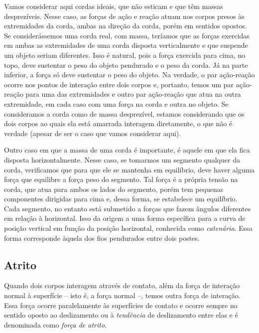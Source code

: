Vamos considerar aqui cordas ideais, que não esticam e que têm massas desprezíveis. Nesse caso, as forças de ação e reação atuam nos corpos presos às extremidades da corda, ambas na direção da corda, porém em sentidos opostos. Se considerássemos uma corda real, com massa, teríamos que as forças exercidas em ambas as extremidades de uma corda disposta verticalmente e que suspende um objeto seriam diferentes. Isso é natural, pois a força exercida para cima, no topo, deve sustentar o peso do objeto pendurado e o peso da corda. Já na parte inferior, a força só deve sustentar o peso do objeto. Na verdade, o par ação-reação ocorre nos pontos de interação entre dois corpos e, portanto, temos um par ação-reação para uma das extremidades e outro par ação-reação que atua na outra extremidade, em cada caso com uma força na corda e outra no objeto. Se consideramos a corda como de massa desprezível, estamos considerando que os dois corpos ao quais ela está amarrada interagem diretamente, o que não é verdade (apesar de ser o caso que vamos considerar aqui). 

Outro caso em que a massa de uma corda é importante, é aquele em que ela fica disposta horizontalmente. Nesse caso, se tomarmos um segmento qualquer da corda, verificamos que para que ele se mantenha em equilíbrio, deve haver alguma força que equilibre a força peso do segmento. Tal força é a própria tensão na corda, que atua para ambos os lados do segmento, porém tem pequenas componentes dirigidas para cima e, dessa forma, se estabelece um equilíbrio. Cada segmento, no entanto está submetido a forças que fazem ângulos diferentes em relação à horizontal. Isso da origem a uma forma específica para a curva de posição vertical em função da posição horizontal, conhecida como \emph{catenária}. Essa forma corresponde àquela dos fios pendurados entre dois postes. 

\subsection{Atrito}

Quando dois corpos interagem através de contato, além da força de interação normal à superfície -- isto é, a força normal --, temos outra força de interação. Essa força ocorre paralelamente às superfícies de contato e ocorre sempre no sentido oposto ao deslizamento ou à \emph{tendência} de deslizamento entre elas e é denominada como \emph{força de atrito}.

